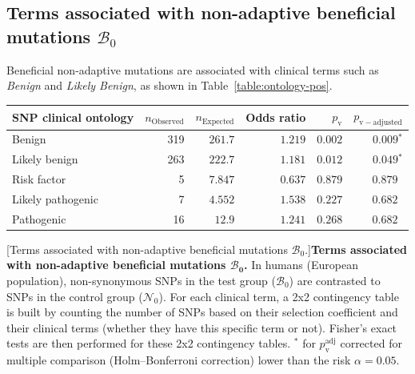 \documentclass{article}
\newcommand{\SphyNeu}{\mathcal{N}_0}
\newcommand{\SphyBen}{\mathcal{B}_0}
\begin{document}
    \subsection{Terms associated with non-adaptive beneficial mutations \texorpdfstring{$\SphyBen$}{B₀}}
    Beneficial non-adaptive mutations are associated with clinical terms such as \textit{Benign} and \textit{Likely Benign}, as shown in Table~\ref{table:ontology-pos}.
    \begin{center}
        \begin{tabular}{|l|r|r|r|r|r|}
            \toprule
            SNP clinical ontology & $n_{\mathrm{Observed}}$ & $n_{\mathrm{Expected}}$ & Odds ratio & $p_{\mathrm{v}}$ & $p_{\mathrm{v-adjusted}}$ \\
            \midrule
            Benign                & 319                     & $ 261.7$                & $ 1.219$   & $ 0.002$         & $\bm{ 0.009{^*}}$         \\
            Likely benign         & 263                     & $ 222.7$                & $ 1.181$   & $ 0.012$         & $\bm{ 0.049{^*}}$         \\
            Risk factor           & 5                       & $ 7.847$                & $ 0.637$   & $ 0.879$         & $ 0.879~~$                \\
            Likely pathogenic     & 7                       & $ 4.552$                & $ 1.538$   & $ 0.227$         & $ 0.682~~$                \\
            Pathogenic            & 16                      & $  12.9$                  & $ 1.241$   & $ 0.268$         & $ 0.682~~$                \\
            \bottomrule
        \end{tabular}
        [Terms associated with non-adaptive beneficial mutations $\SphyBen$.]{\textbf{Terms associated with non-adaptive beneficial mutations $\bm{\SphyBen}$.}
        In humans (European population), non-synonymous SNPs in the test group ($\SphyBen$) are contrasted to SNPs in the control group ($\SphyNeu$).
        For each clinical term, a 2x2 contingency table is built by counting the number of SNPs based on their selection coefficient and their clinical terms (whether they have this specific term or not).
        Fisher's exact tests are then performed for these 2x2 contingency tables.
        $^*$ for $p_{\mathrm{v}}^{\mathrm{adj}}$ corrected for multiple comparison (Holm–Bonferroni correction) lower than the risk $\alpha=0.05$.\label{table:ontology-pos}}
    \end{center}
\end{document}
